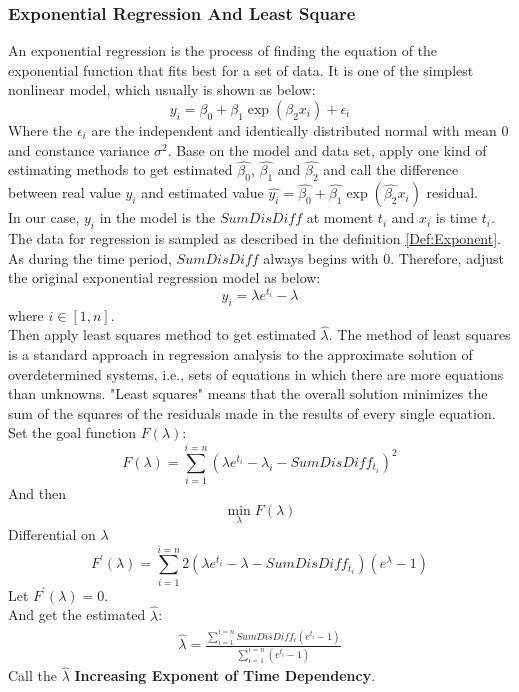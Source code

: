 \documentclass[
     11pt,         %
     a4paper,      %
     oneside,
     ]{article}
\begin{document}
\subsubsection{Exponential Regression And Least Square}
An exponential regression is the process of finding the equation of the exponential function that fits best for a set of data. It is one of the simplest nonlinear model, which usually is shown as below:
$$y_{i}=\beta_{0}+\beta_{1}\exp(\beta_{2}x_{i})+\epsilon_{i}$$
Where the $\epsilon_{i}$ are the independent and identically distributed normal with mean 0 and constance variance $\sigma^{2}$. Base on the model and data set, apply one kind of estimating methods to get estimated 
$\hat{\beta_{0}}$, $\hat{\beta_{1}}$ and $\hat{\beta_{2}}$ and call the difference between real value $y_{i}$ and estimated value $\hat{y_{i}}=\hat{\beta_{0}}+\hat{\beta_{1}}\exp(\hat{\beta_{2}}x_{i})$ residual.\\
In our case, $y_{i}$ in the model is the $SumDisDiff$ at moment $t_{i}$ and $x_{i}$ is time $t_{i}$.\\
The data for regression is sampled as described in the definition \ref{Def:Exponent}. As during the time period, $SumDisDiff$ always begins with 0. Therefore, adjust the original exponential regression model as below:\\ 
$$y_{i}=\lambda e^{t_{i}}-\lambda$$ where $i\in [1,n]$.\\
Then apply least squares method to get estimated $\hat{\lambda}$. The method of least squares is a standard approach in regression analysis to the approximate solution of overdetermined systems, i.e., sets of equations in which there are more equations than unknowns. "Least squares" means that the overall solution minimizes the sum of the squares of the residuals made in the results of every single equation.\\
Set the goal function $F(\lambda)$:
$$F(\lambda)=\sum_{i=1}^{i=n}(\lambda e^{t_{i}}-\lambda_{i}-SumDisDiff_{t_{i}})^{2}$$
And then $$\min_{\lambda} F(\lambda)$$
Differential on $\lambda$
$$F^{'}(\lambda)=\sum_{i=1}^{i=n}2(\lambda e^{t_{i}}-\lambda-SumDisDiff_{t_{i}})(e^{\lambda}-1)$$
Let $F^{'}(\lambda)=0$.\\
And get the estimated $\hat{\lambda}$:
\begin{eqnarray}
\label{Equation:lambda}
\hat{\lambda}=\frac{\sum_{i=1}^{i=n}SumDisDiff_{i}(e^{t_{i}}-1)}{\sum_{i=1}^{i=n}(e^{t_{i}}-1)}
\end{eqnarray}
Call the $\hat{\lambda}$ \textbf{Increasing Exponent of Time Dependency}.\\
\end{document}
